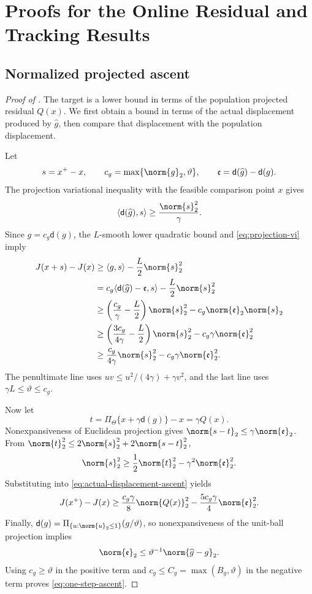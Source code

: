 \section{Proofs for the Online Residual and Tracking Results}\label{app:online}

\subsection{Normalized projected ascent}

\begin{proof}[Proof of ]
The target is a lower bound in terms of the population projected residual $Q(x)$.  We first obtain a bound in terms of the actual displacement produced by $\widehat g$, then compare that displacement with the population displacement.

Let
\[
 s=x^+-x,
 \qquad
 c_g=\max\{\norm{g}_2,\vartheta\},
 \qquad
 \mathfrak e=\mathsf d(\widehat g)-\mathsf d(g).
\]
The projection variational inequality with the feasible comparison point $x$ gives
\begin{equation}\label{eq:projection-vi}
 \langle\mathsf d(\widehat g),s\rangle\ge\frac{\norm{s}_2^2}{\gamma}.
\end{equation}
Since $g=c_g\mathsf d(g)$, the $L$-smooth lower quadratic bound and \eqref{eq:projection-vi} imply
\begin{align}
 J(x+s)-J(x)
 &\ge \langle g,s\rangle-\frac L2\norm{s}_2^2\notag\\
 &=c_g\langle\mathsf d(\widehat g)-\mathfrak e,s\rangle
 -\frac L2\norm{s}_2^2\notag\\
 &\ge\left(\frac{c_g}{\gamma}-\frac L2\right)\norm{s}_2^2
 -c_g\norm{\mathfrak e}_2\norm{s}_2\notag\\
 &\ge\left(\frac{3c_g}{4\gamma}-\frac L2\right)\norm{s}_2^2
 -c_g\gamma\norm{\mathfrak e}_2^2\notag\\
 &\ge\frac{c_g}{4\gamma}\norm{s}_2^2
 -c_g\gamma\norm{\mathfrak e}_2^2.
 \label{eq:actual-displacement-ascent}
\end{align}
The penultimate line uses
$uv\le u^2/(4\gamma)+\gamma v^2$, and the last line uses
$\gamma L\le \vartheta\le c_g$.

Now let
\[
 t=\Pi_\Theta\{x+\gamma\mathsf d(g)\}-x=\gamma Q(x).
\]
Nonexpansiveness of Euclidean projection gives
$\norm{s-t}_2\le\gamma\norm{\mathfrak e}_2$.  From
$\norm{t}_2^2\le2\norm{s}_2^2+2\norm{s-t}_2^2$,
\[
 \norm{s}_2^2\ge\frac12\norm{t}_2^2-\gamma^2\norm{\mathfrak e}_2^2.
\]
Substituting into \eqref{eq:actual-displacement-ascent} yields
\[
 J(x^+)-J(x)
 \ge\frac{c_g\gamma}{8}\norm{Q(x)}_2^2
 -\frac{5c_g\gamma}{4}\norm{\mathfrak e}_2^2.
\]
Finally,
$\mathsf d(g)=\Pi_{\{u:\norm{u}_2\le1\}}(g/\vartheta)$, so nonexpansiveness of the unit-ball projection implies
\[
 \norm{\mathfrak e}_2\le \vartheta^{-1}\norm{\widehat g-g}_2.
\]
Using $c_g\ge \vartheta$ in the positive term and
$c_g\le C_g=\max(B_g,\vartheta)$ in the negative term proves \eqref{eq:one-step-ascent}.
\end{proof}

